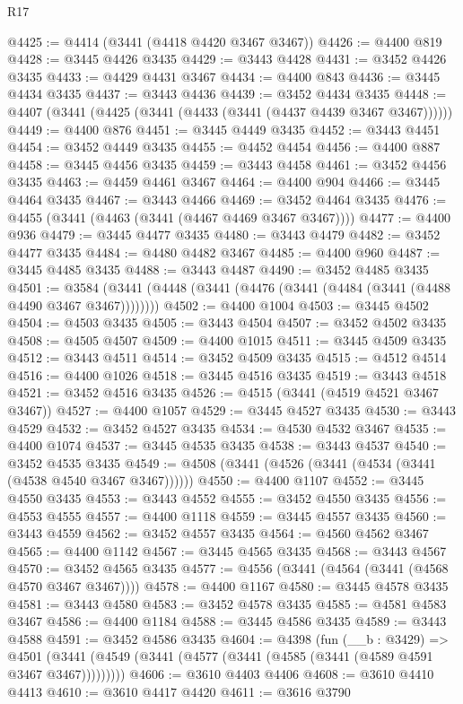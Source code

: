 \begin{lexlean}{R17}
\begin{coremodule}
@4425 := @4414 (@3441 (@4418 @4420 @3467 @3467))
@4426 := @4400 @819
@4428 := @3445 @4426 @3435
@4429 := @3443 @4428
@4431 := @3452 @4426 @3435
@4433 := @4429 @4431 @3467
@4434 := @4400 @843
@4436 := @3445 @4434 @3435
@4437 := @3443 @4436
@4439 := @3452 @4434 @3435
@4448 := @4407 (@3441 (@4425 (@3441 (@4433 (@3441 (@4437 @4439 @3467 @3467))))))
@4449 := @4400 @876
@4451 := @3445 @4449 @3435
@4452 := @3443 @4451
@4454 := @3452 @4449 @3435
@4455 := @4452 @4454
@4456 := @4400 @887
@4458 := @3445 @4456 @3435
@4459 := @3443 @4458
@4461 := @3452 @4456 @3435
@4463 := @4459 @4461 @3467
@4464 := @4400 @904
@4466 := @3445 @4464 @3435
@4467 := @3443 @4466
@4469 := @3452 @4464 @3435
@4476 := @4455 (@3441 (@4463 (@3441 (@4467 @4469 @3467 @3467))))
@4477 := @4400 @936
@4479 := @3445 @4477 @3435
@4480 := @3443 @4479
@4482 := @3452 @4477 @3435
@4484 := @4480 @4482 @3467
@4485 := @4400 @960
@4487 := @3445 @4485 @3435
@4488 := @3443 @4487
@4490 := @3452 @4485 @3435
@4501 := @3584 (@3441 (@4448 (@3441 (@4476 (@3441 (@4484 (@3441 (@4488 @4490 @3467 @3467))))))))
@4502 := @4400 @1004
@4503 := @3445 @4502
@4504 := @4503 @3435
@4505 := @3443 @4504
@4507 := @3452 @4502 @3435
@4508 := @4505 @4507
@4509 := @4400 @1015
@4511 := @3445 @4509 @3435
@4512 := @3443 @4511
@4514 := @3452 @4509 @3435
@4515 := @4512 @4514
@4516 := @4400 @1026
@4518 := @3445 @4516 @3435
@4519 := @3443 @4518
@4521 := @3452 @4516 @3435
@4526 := @4515 (@3441 (@4519 @4521 @3467 @3467))
@4527 := @4400 @1057
@4529 := @3445 @4527 @3435
@4530 := @3443 @4529
@4532 := @3452 @4527 @3435
@4534 := @4530 @4532 @3467
@4535 := @4400 @1074
@4537 := @3445 @4535 @3435
@4538 := @3443 @4537
@4540 := @3452 @4535 @3435
@4549 := @4508 (@3441 (@4526 (@3441 (@4534 (@3441 (@4538 @4540 @3467 @3467))))))
@4550 := @4400 @1107
@4552 := @3445 @4550 @3435
@4553 := @3443 @4552
@4555 := @3452 @4550 @3435
@4556 := @4553 @4555
@4557 := @4400 @1118
@4559 := @3445 @4557 @3435
@4560 := @3443 @4559
@4562 := @3452 @4557 @3435
@4564 := @4560 @4562 @3467
@4565 := @4400 @1142
@4567 := @3445 @4565 @3435
@4568 := @3443 @4567
@4570 := @3452 @4565 @3435
@4577 := @4556 (@3441 (@4564 (@3441 (@4568 @4570 @3467 @3467))))
@4578 := @4400 @1167
@4580 := @3445 @4578 @3435
@4581 := @3443 @4580
@4583 := @3452 @4578 @3435
@4585 := @4581 @4583 @3467
@4586 := @4400 @1184
@4588 := @3445 @4586 @3435
@4589 := @3443 @4588
@4591 := @3452 @4586 @3435
@4604 := @4398
    (fun (__b : @3429) =>
    @4501 (@3441 (@4549 (@3441 (@4577 (@3441 (@4585 (@3441 (@4589 @4591 @3467 @3467)))))))))
@4606 := @3610 @4403 @4406
@4608 := @3610 @4410 @4413
@4610 := @3610 @4417 @4420
@4611 := @3616 @3790

\end{coremodule}
\end{lexlean}
